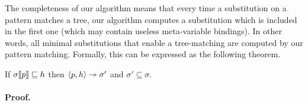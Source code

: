 
The completeness of our algorithm means that every time a substitution
on a pattern matches a tree, our algorithm computes a substitution
which is included in the first one (which may contain useless
meta\hyp{}variable bindings). In other words, all minimal
substitutions that enable a tree\hyp{}matching are computed by our
pattern matching. Formally, this can be expressed as the following
theorem.
\begin{theorem}[Completeness]\hfill
\begin{center}
If   \(\subst{{p}}{\sigma} \sqsubseteq h\)
then \(\smat{h}{{p}} \twoheadrightarrow \sigma'\)
and  \(\sigma' \subseteq \sigma\).
\end{center}
\end{theorem}


\paragraph{Proof.}

